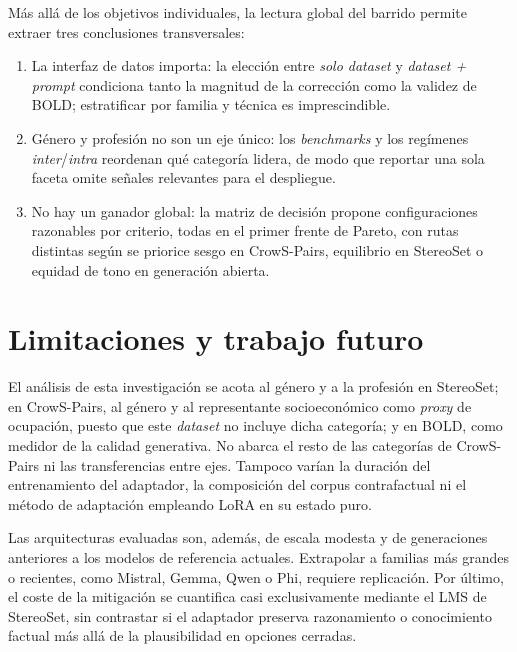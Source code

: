 \documentclass[12pt,a4paper]{report}
\begin{document}
Más allá de los objetivos individuales, la lectura global del barrido permite extraer tres conclusiones transversales:
\begin{enumerate}
  \item La interfaz de datos importa: la elección entre \textit{solo dataset} y \textit{dataset + prompt} condiciona tanto la magnitud de la corrección como la validez de BOLD; estratificar por familia y técnica es imprescindible.
  \item Género y profesión no son un eje único: los \textit{benchmarks} y los regímenes \textit{inter}/\textit{intra} reordenan qué categoría lidera, de modo que reportar una sola faceta omite señales relevantes para el despliegue.
  \item No hay un ganador global: la matriz de decisión propone configuraciones razonables por criterio, todas en el primer frente de Pareto, con rutas distintas según se priorice sesgo en CrowS-Pairs, equilibrio en StereoSet o equidad de tono en generación abierta.
\end{enumerate}

\section{Limitaciones y trabajo futuro}
\label{sec:ex_limitaciones}

El análisis de esta investigación se acota al género y a la profesión en StereoSet; en CrowS-Pairs, al género y al representante socioeconómico como \textit{proxy} de ocupación, puesto que este \textit{dataset} no incluye dicha categoría; y en BOLD, como medidor de la calidad generativa. No abarca el resto de las categorías de CrowS-Pairs ni las transferencias entre ejes. Tampoco varían la duración del entrenamiento del adaptador, la composición del corpus contrafactual ni el método de adaptación empleando LoRA en su estado puro.

Las arquitecturas evaluadas son, además, de escala modesta y de generaciones anteriores a los modelos de referencia actuales. Extrapolar a familias más grandes o recientes, como Mistral, Gemma, Qwen o Phi, requiere replicación. Por último, el coste de la mitigación se cuantifica casi exclusivamente mediante el LMS de StereoSet, sin contrastar si el adaptador preserva razonamiento o conocimiento factual más allá de la plausibilidad en opciones cerradas.
\end{document}
